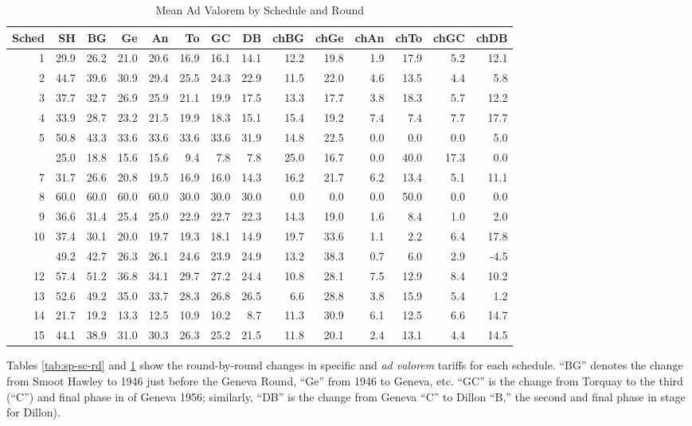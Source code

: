 \documentclass[
  12pt,
]{article}
\begin{document}
\begin{table}[!h]

\caption{\label{tab:av-sc-rd}Mean Ad Valorem by Schedule and Round}
\centering
\begin{tabular}[t]{rrrrrrrrrrrrrr}
\toprule
Sched & SH & BG & Ge & An & To & GC & DB & chBG & chGe & chAn & chTo & chGC & chDB\\
\midrule
1 & 29.9 & 26.2 & 21.0 & 20.6 & 16.9 & 16.1 & 14.1 & 12.2 & 19.8 & 1.9 & 17.9 & 5.2 & 12.1\\
2 & 44.7 & 39.6 & 30.9 & 29.4 & 25.5 & 24.3 & 22.9 & 11.5 & 22.0 & 4.6 & 13.5 & 4.4 & 5.8\\
3 & 37.7 & 32.7 & 26.9 & 25.9 & 21.1 & 19.9 & 17.5 & 13.3 & 17.7 & 3.8 & 18.3 & 5.7 & 12.2\\
4 & 33.9 & 28.7 & 23.2 & 21.5 & 19.9 & 18.3 & 15.1 & 15.4 & 19.2 & 7.4 & 7.4 & 7.7 & 17.7\\
5 & 50.8 & 43.3 & 33.6 & 33.6 & 33.6 & 33.6 & 31.9 & 14.8 & 22.5 & 0.0 & 0.0 & 0.0 & 5.0\\
\addlinespace
6 & 25.0 & 18.8 & 15.6 & 15.6 & 9.4 & 7.8 & 7.8 & 25.0 & 16.7 & 0.0 & 40.0 & 17.3 & 0.0\\
7 & 31.7 & 26.6 & 20.8 & 19.5 & 16.9 & 16.0 & 14.3 & 16.2 & 21.7 & 6.2 & 13.4 & 5.1 & 11.1\\
8 & 60.0 & 60.0 & 60.0 & 60.0 & 30.0 & 30.0 & 30.0 & 0.0 & 0.0 & 0.0 & 50.0 & 0.0 & 0.0\\
9 & 36.6 & 31.4 & 25.4 & 25.0 & 22.9 & 22.7 & 22.3 & 14.3 & 19.0 & 1.6 & 8.4 & 1.0 & 2.0\\
10 & 37.4 & 30.1 & 20.0 & 19.7 & 19.3 & 18.1 & 14.9 & 19.7 & 33.6 & 1.1 & 2.2 & 6.4 & 17.8\\
\addlinespace
11 & 49.2 & 42.7 & 26.3 & 26.1 & 24.6 & 23.9 & 24.9 & 13.2 & 38.3 & 0.7 & 6.0 & 2.9 & -4.5\\
12 & 57.4 & 51.2 & 36.8 & 34.1 & 29.7 & 27.2 & 24.4 & 10.8 & 28.1 & 7.5 & 12.9 & 8.4 & 10.2\\
13 & 52.6 & 49.2 & 35.0 & 33.7 & 28.3 & 26.8 & 26.5 & 6.6 & 28.8 & 3.8 & 15.9 & 5.4 & 1.2\\
14 & 21.7 & 19.2 & 13.3 & 12.5 & 10.9 & 10.2 & 8.7 & 11.3 & 30.9 & 6.1 & 12.5 & 6.6 & 14.7\\
15 & 44.1 & 38.9 & 31.0 & 30.3 & 26.3 & 25.2 & 21.5 & 11.8 & 20.1 & 2.4 & 13.1 & 4.4 & 14.5\\
\bottomrule
\end{tabular}
\end{table}

Tables \ref{tab:sp-sc-rd} and \ref{tab:av-sc-rd} show the round-by-round changes in specific and \emph{ad valorem} tariffs for each schedule. ``BG'' denotes the change from Smoot Hawley to 1946 just before the Geneva Round, ``Ge'' from 1946 to Geneva, etc. ``GC'' is the change from Torquay to the third (``C'') and final phase in of Geneva 1956; similarly, ``DB'' is the change from Geneva ``C'' to Dillon ``B,'' the second and final phase in stage for Dillon).
\end{document}
